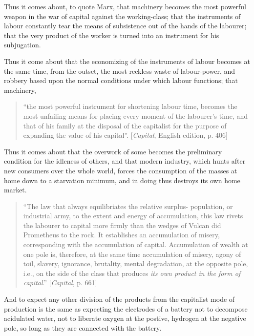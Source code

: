 Thus it comes about, to quote Marx, that machinery becomes the most powerful
weapon in the war of capital against the working-class; that the instruments of
labour constantly tear the means of subsistence out of the hands of the
labourer; that the very product of the worker is turned into an instrument for
his subjugation.

Thus it come about that the economizing of the instruments of labour becomes at
the same time, from the outset, the most reckless waste of labour-power, and
robbery based upon the normal conditions under which labour functions; that
machinery,
%
\begin{quote}
  ``the most powerful instrument for shortening labour time, becomes the most
  unfailing means for placing every moment of the labourer's time, and that of
  his family at the disposal of the capitalist for the purpose of expanding the
  value of his capital''. [\emph{Capital}, English edition, p. 406]
\end{quote}

Thus it comes about that the overwork of some becomes the preliminary condition
for the idleness of others, and that modern industry, which hunts after new
consumers over the whole world, forces the consumption of the masses at home
down to a starvation minimum, and in doing thus destroys its own home market.
%
\begin{quote}
  ``The law that always equilibriates the relative surplus- population, or
  industrial army, to the extent and energy of accumulation, this law rivets the
  labourer to capital more firmly than the wedges of Vulcan did Prometheus to
  the rock. It establishes an accumulation of misery, corresponding with the
  accumulation of capital. Accumulation of wealth at one pole is, therefore, at
  the same time accumulation of misery, agony of toil, slavery, ignorance,
  brutality, mental degradation, at the opposite pole, i.e., on the side of the
  class that produces \emph{its own product in the form of capital}.''
  [\emph{Capital}, p. 661]
\end{quote}
%
And to expect any other division of the products from the capitalist mode of
production is the same as expecting the electrodes of a battery not to decompose
acidulated water, not to liberate oxygen at the postive, hydrogen at the
negative pole, so long as they are connected with the battery.

